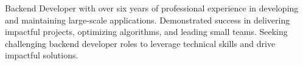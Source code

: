 


Backend Developer with over six years of professional experience in developing and maintaining large-scale applications. Demonstrated success in delivering impactful projects, optimizing algorithms, and leading small teams. Seeking challenging backend developer roles to leverage technical skills and drive impactful solutions.

